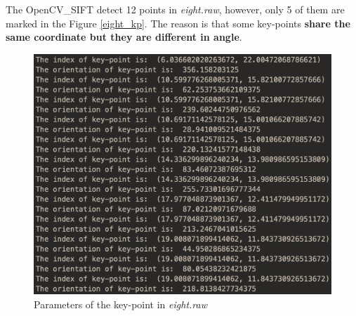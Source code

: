 \documentclass[11pt]{article}
\begin{document}
The OpenCV\_SIFT detect 12 points in {\it eight.raw}, however, only 5 of them are marked in the Figure \ref{eight_kp}. The reason is that some key-points {\bf share the same coordinate but they are different in angle}. 

\begin{figure}[!htp]
	\centering
	\includegraphics[scale=0.3]{paraofeight.png}
	\caption{ Parameters of the key-point in {\it eight.raw}}
	\label{paraofeight}
	\end{figure}




%
%
%
\end{document}
